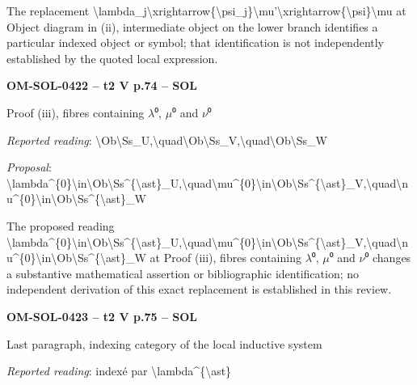 The replacement \textbackslash{}lambda\_j\textbackslash{}xrightarrow\{\textbackslash{}psi\_j\}\textbackslash{}mu'\textbackslash{}xrightarrow\{\textbackslash{}psi\}\textbackslash{}mu at Object diagram in (ii), intermediate object on the lower branch identifies a particular indexed object or symbol; that identification is not independently established by the quoted local expression.\par
\par\noindent\textbf{OM-SOL-0422 -- t2 V p.74 -- SOL}\par
Proof (iii), fibres containing \ensuremath{\lambda}⁰, \ensuremath{\mu}⁰ and \ensuremath{\nu}⁰\par
\emph{Reported reading}: \textbackslash{}Ob\textbackslash{}Ss\_U,\textbackslash{}quad\textbackslash{}Ob\textbackslash{}Ss\_V,\textbackslash{}quad\textbackslash{}Ob\textbackslash{}Ss\_W\par
\emph{Proposal}: \textbackslash{}lambda\textasciicircum{}\{0\}\textbackslash{}in\textbackslash{}Ob\textbackslash{}Ss\textasciicircum{}\{\textbackslash{}ast\}\_U,\textbackslash{}quad\textbackslash{}mu\textasciicircum{}\{0\}\textbackslash{}in\textbackslash{}Ob\textbackslash{}Ss\textasciicircum{}\{\textbackslash{}ast\}\_V,\textbackslash{}quad\textbackslash{}nu\textasciicircum{}\{0\}\textbackslash{}in\textbackslash{}Ob\textbackslash{}Ss\textasciicircum{}\{\textbackslash{}ast\}\_W\par
The proposed reading \textbackslash{}lambda\textasciicircum{}\{0\}\textbackslash{}in\textbackslash{}Ob\textbackslash{}Ss\textasciicircum{}\{\textbackslash{}ast\}\_U,\textbackslash{}quad\textbackslash{}mu\textasciicircum{}\{0\}\textbackslash{}in\textbackslash{}Ob\textbackslash{}Ss\textasciicircum{}\{\textbackslash{}ast\}\_V,\textbackslash{}quad\textbackslash{}nu\textasciicircum{}\{0\}\textbackslash{}in\textbackslash{}Ob\textbackslash{}Ss\textasciicircum{}\{\textbackslash{}ast\}\_W at Proof (iii), fibres containing \ensuremath{\lambda}⁰, \ensuremath{\mu}⁰ and \ensuremath{\nu}⁰ changes a substantive mathematical assertion or bibliographic identification; no independent derivation of this exact replacement is established in this review.\par
\par\noindent\textbf{OM-SOL-0423 -- t2 V p.75 -- SOL}\par
Last paragraph, indexing category of the local inductive system\par
\emph{Reported reading}: indexé par \textbackslash{}lambda\textasciicircum{}\{\textbackslash{}ast\}\par

